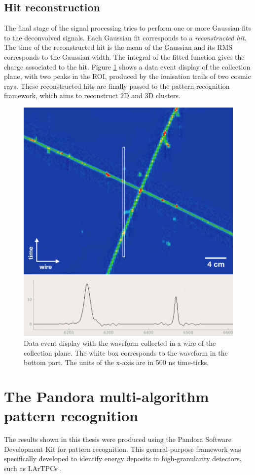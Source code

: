 \subsection{Hit reconstruction}
The final stage of the signal processing tries to perform one or more Gaussian fits to the deconvolved signals. Each Gaussian fit corresponds to a \emph{reconstructed hit}. The time of the reconstructed hit is the mean of the Gaussian and its RMS corresponds to the Gaussian width. The integral of the fitted function gives the charge associated to the hit. Figure \ref{fig:evd_wires} shows a data event display of the collection plane, with two peaks in the ROI, produced by the ionisation trails of two cosmic rays. 
These reconstructed hits are finally passed to the pattern recognition framework, which aims to reconstruct 2D and 3D clusters. 

\begin{figure}[htbp]
    \centering
    \includegraphics[width=0.8\linewidth]{figures/evd_wires.png}
    \caption{Data event display with the waveform collected in a wire of the collection plane. The white box corresponds to the waveform in the bottom part. The units of the x-axis are in 500 ns time-ticks.}
    \label{fig:evd_wires}
\end{figure}

\section{The Pandora multi-algorithm pattern recognition}
The results shown in this thesis were produced using the Pandora Software Development Kit for pattern recognition. This general-purpose framework was specifically developed to identify energy deposits in high-granularity detectors, such as LArTPCs \cite{Marshall:2015rfa}.

